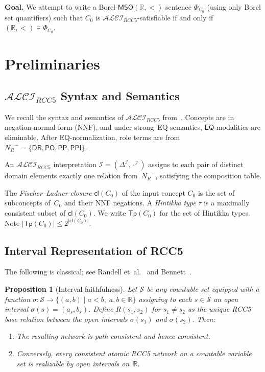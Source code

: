 \documentclass[a4paper,11pt]{article}
\newtheorem{proposition}[theorem]{Proposition}
\theoremstyle{definition}
\newcommand{\ALCIRCC}[1]{\ensuremath{\mathcal{ALCI}_{\mathit{RCC#1}}}}
\newcommand{\NR}{\ensuremath{N_R}}
\newcommand{\DeltaI}{\ensuremath{\Delta^{\mathcal{I}}}}
\newcommand{\interp}{\ensuremath{\mathcal{I}}}
\newcommand{\DR}{\ensuremath{\mathsf{DR}}}
\newcommand{\PO}{\ensuremath{\mathsf{PO}}}
\newcommand{\EQ}{\ensuremath{\mathsf{EQ}}}
\newcommand{\PP}{\ensuremath{\mathsf{PP}}}
\newcommand{\PPI}{\ensuremath{\mathsf{PPI}}}
\newcommand{\cl}{\ensuremath{\mathsf{cl}}}
\newcommand{\Tp}{\ensuremath{\mathsf{Tp}}}
\newcommand{\MSO}{\ensuremath{\mathsf{MSO}}}
\newcommand{\reals}{\ensuremath{\mathbb{R}}}
\begin{document}
\medskip
\noindent
\textbf{Goal.}\;
We attempt to write a Borel-$\MSO(\reals, <)$ sentence $\Phi_{C_0}$
(using only Borel set quantifiers) such that $C_0$ is
$\ALCIRCC{5}$-satisfiable if and only if
$(\reals, <) \models \Phi_{C_0}$.

\section{Preliminaries}
\label{sec:prelim}

\subsection{$\ALCIRCC{5}$ Syntax and Semantics}

We recall the syntax and semantics of $\ALCIRCC{5}$ from~\cite{Wessel2003,OurMainPaper}.
Concepts are in negation normal form (NNF), and under strong~EQ
semantics, $\EQ$-modalities are eliminable.
After EQ-normalization, role terms are from $\NR^{-} = \{\DR, \PO, \PP, \PPI\}$.

An $\ALCIRCC{5}$ interpretation $\interp = (\DeltaI, \cdot^{\interp})$
assigns to each pair of distinct domain elements exactly one relation
from~$\NR^{-}$, satisfying the composition table.

The \emph{Fischer--Ladner closure} $\cl(C_0)$ of the input concept
$C_0$ is the set of subconcepts of~$C_0$ and their NNF negations.
A \emph{Hintikka type} $\tau$ is a maximally consistent subset of
$\cl(C_0)$.  We write $\Tp(C_0)$ for the set of Hintikka types.
Note $|\Tp(C_0)| \leq 2^{|\cl(C_0)|}$.

\subsection{Interval Representation of RCC5}
\label{sec:interval-rep}

The following is classical; see
Randell et~al.~\cite{RandellCuiCohn1992} and
Bennett~\cite{Bennett1994}.

\begin{proposition}[Interval faithfulness]
\label{prop:interval}
Let $\mathcal{S}$ be any countable set equipped with a function
$\sigma : \mathcal{S} \to \{(a,b) \mid a < b,\; a,b \in \reals\}$
assigning to each $s \in \mathcal{S}$ an open interval
$\sigma(s) = (a_s, b_s)$.  Define $R(s_1, s_2)$ for $s_1 \neq s_2$
as the unique RCC5 base relation between the open intervals
$\sigma(s_1)$ and $\sigma(s_2)$.  Then:
\begin{enumerate}[nosep,label=(\alph*)]
  \item The resulting network is path-consistent and hence
    consistent.
  \item Conversely, every consistent atomic RCC5 network on a
    countable variable set is realizable by open intervals
    on~$\reals$.
\end{enumerate}
\end{proposition}
\end{document}
